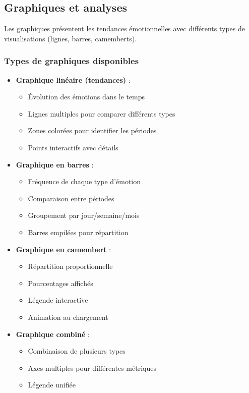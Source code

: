 \documentclass[a4paper,11pt]{report}
\begin{document}
\subsection{Graphiques et analyses}

Les graphiques présentent les tendances émotionnelles avec différents types de visualisations (lignes, barres, camemberts).

\subsubsection{Types de graphiques disponibles}

\begin{itemize}
    \item \textbf{Graphique linéaire (tendances)} :
    \begin{itemize}
        \item Évolution des émotions dans le temps
        \item Lignes multiples pour comparer différents types
        \item Zones colorées pour identifier les périodes
        \item Points interactifs avec détails
    \end{itemize}
    
    \item \textbf{Graphique en barres} :
    \begin{itemize}
        \item Fréquence de chaque type d'émotion
        \item Comparaison entre périodes
        \item Groupement par jour/semaine/mois
        \item Barres empilées pour répartition
    \end{itemize}
    
    \item \textbf{Graphique en camembert} :
    \begin{itemize}
        \item Répartition proportionnelle
        \item Pourcentages affichés
        \item Légende interactive
        \item Animation au chargement
    \end{itemize}
    
    \item \textbf{Graphique combiné} :
    \begin{itemize}
        \item Combinaison de plusieurs types
        \item Axes multiples pour différentes métriques
        \item Légende unifiée
    \end{itemize}
\end{itemize}
\end{document}
